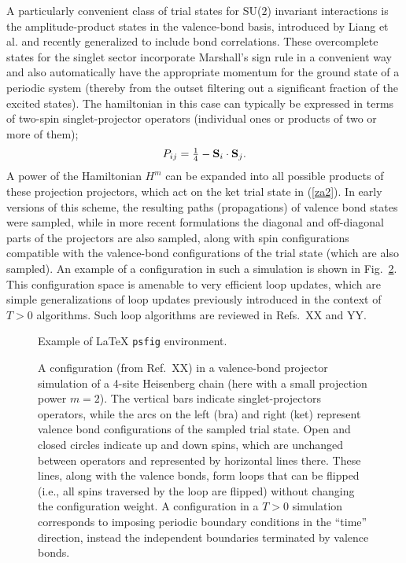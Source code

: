 \documentclass[range]{ar2e}
\begin{document}
A particularly convenient class of trial states for SU($2$) invariant interactions is the amplitude-product states in the valence-bond basis, 
introduced by Liang et al. and recently generalized to include bond correlations. These overcomplete states for the singlet sector incorporate
Marshall's sign rule in a convenient way and also automatically have the appropriate momentum for the ground state of a periodic system (thereby
from the outset filtering out a significant fraction of the excited states). The hamiltonian in this case can typically be expressed in terms of 
two-spin singlet-projector operators  (individual ones or products of two or more of them);
\begin{equation}
P_{ij}=\hbox{$\frac{1}{4}$}-{\bf S}_i\cdot {\bf S}_j.
\label{psinglet}
\end{equation}
A power of the Hamiltonian $H^m$ can be expanded into all possible products of these projection projectors, which act on the ket trial state in 
(\ref{za2}). In early versions of this scheme, the resulting paths (propagations) of valence bond states were sampled, while in more 
recent formulations the diagonal and off-diagonal parts of the projectors are also sampled, along with spin configurations compatible with 
the valence-bond configurations of the trial state (which are also sampled).\cite{Sandvik10a} An example of a configuration in such a simulation is shown 
in Fig.~\ref{loops}. This configuration space is amenable to very efficient loop updates, which are simple generalizations of loop updates 
previously introduced in the context of $T>0$ algorithms. Such loop algorithms are reviewed in Refs.~XX and YY.

\begin{figure}%

\caption{Example of LaTeX {\tt psfig} environment.}
\label{fig3}
\end{figure}

\begin{figure}
\centerline{}
\caption{A configuration (from Ref.~XX) in a valence-bond projector simulation of a 4-site Heisenberg chain (here with a small
projection power $m=2$). The vertical bars indicate singlet-projectors operators, while the arcs on the left (bra) and right (ket) 
represent valence bond configurations of the sampled trial state. Open and closed circles indicate up and down spins, which are unchanged 
between operators and represented by horizontal lines there. These lines, along with the valence bonds, form loops that can be flipped
(i.e., all spins traversed by the loop are flipped) without changing the configuration weight. A configuration in a $T>0$ simulation 
corresponds to imposing periodic boundary conditions in the ``time'' direction, instead the independent boundaries
terminated by valence bonds.}
\label{loops}
\end{figure}
\end{document}
